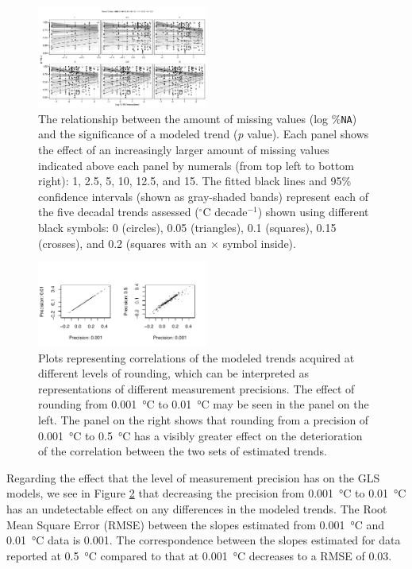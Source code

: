 \documentclass[twocol]{ametsoc}
\begin{document}
\begin{figure}
\centering \includegraphics[width=0.50\textwidth]{figure07}
\caption{The relationship between the amount of missing values (log \%\texttt{NA}) and the significance of a modeled trend (\emph{p} value). Each panel shows the effect of an increasingly larger amount of missing values indicated above each panel by numerals (from top left to bottom right): 1, 2.5, 5, 10, 12.5, and 15. The fitted black lines and 95\% confidence intervals (shown as gray-shaded bands) represent each of the five decadal trends assessed ($^{\circ}$C decade$^{-1}$) shown using different black symbols: 0 (circles), 0.05 (triangles), 0.1 (squares), 0.15 (crosses), and 0.2 (squares with an $\times$ symbol inside).}
\label{figure07}
\end{figure}

\begin{figure}
\centering \includegraphics[width=0.50\textwidth]{figure08}
\caption{Plots representing correlations of the modeled trends acquired at different levels of rounding, which can be interpreted as representations of different measurement precisions. The effect of rounding from \SI{0.001}{\degreeCelsius} to \SI{0.01}{\degreeCelsius} may be seen in the panel on the left. The panel on the right shows that rounding from a precision of \SI{0.001}{\degreeCelsius} to \SI{0.5}{\degreeCelsius} has a visibly greater effect on the deterioration of the correlation between the two sets of estimated trends.}
\label{figure08}
\end{figure}

Regarding the effect that the level of measurement precision has on the GLS models, we see in Figure \ref{figure08} that decreasing the precision from \SI{0.001}{\degreeCelsius} to \SI{0.01}{\degreeCelsius} has an undetectable effect on any differences in the modeled trends. The Root Mean Square Error (RMSE) between the slopes estimated from \SI{0.001}{\degreeCelsius} and \SI{0.01}{\degreeCelsius} data is 0.001. The correspondence between the slopes estimated for data reported at \SI{0.5}{\degreeCelsius} compared to that at \SI{0.001}{\degreeCelsius} decreases to a RMSE of 0.03.
\end{document}
